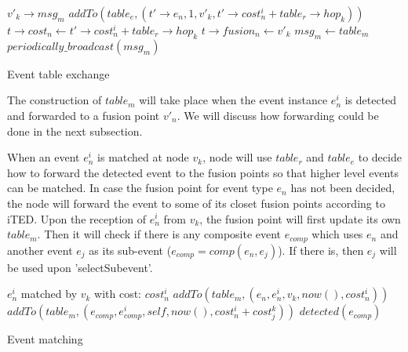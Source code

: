 \begin{algorithm}
\begin{algorithmic}
\REQUIRE \(v'_k\rightarrow msg_m\)
			\STATE \(addTo(table_e, (t'\rightarrow e_n, 1, v'_k, t'\rightarrow cost_n^i+table_r\rightarrow hop_k))\)
		\ENDIF
					\STATE \(t\rightarrow cost_n \gets t'\rightarrow cost_n^i+table_r\rightarrow hop_k\)
					\STATE \(t\rightarrow fusion_n \gets v'_k\)
				\ENDIF
			\ENDIF
		\ENDFOR
	\ENDFOR
		\STATE \(msg_m \gets table_m\)
		\STATE \(periodically\_broadcast(msg_m)\)
	\ENDIF
\end{algorithmic}
\caption{Event table exchange}
\label{algo:table_e}
\end{algorithm}

The construction of \(table_m\) will take place when the event instance \(e_n^i\) is detected and forwarded to a fusion point \(v'_n\). We will discuss how forwarding could be done in the next subsection.

When an event \(e_n^i\) is matched at node \(v_k\), node will use \(table_r\) and \(table_e\) to decide how to forward the detected event to the fusion points so that higher level events can be matched. In case the fusion point for event type \(e_n\) has not been decided, the node will forward the event to some of its closet fusion points  according to iTED. Upon the reception of \(e_n^i\) from \(v_k\), the fusion point will first update its own \(table_m\). Then it will check if there is any composite event \(e_{comp}\) which uses \(e_n\) and another event \(e_j\) as its sub-event (\(e_{comp}=comp(e_n, e_j)\)). If there is, then \(e_j\) will be used upon 'selectSubevent'.

\begin{algorithm}
\begin{algorithmic}
\REQUIRE \(e_n^i\) matched by \(v_k\) with cost: \(cost_n^i\)
	\STATE \(addTo(table_m, (e_n, e_n^i, v_k, now(), cost_n^i))\)
					\STATE \(addTo(table_m, (e_{comp}, e_{comp}^i, self, now(), cost_n^i+cost_j^k))\)
					\STATE \(detected(e_{comp})\)
				\ENDIF
			\ENDFOR
		\ENDIF
	\ENDFOR
\end{algorithmic}
\caption{Event matching}
\label{algo:eventmatching}
\end{algorithm}

